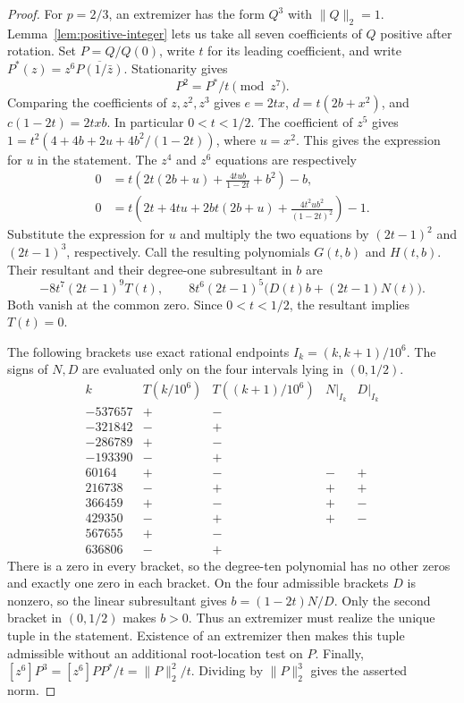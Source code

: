 \documentclass[11pt]{article}
\begin{document}
\begin{proof}
For \(p=2/3\), an extremizer has the form \(Q^3\) with
\(\|Q\|_2=1\). Lemma~\ref{lem:positive-integer} lets us
take all seven coefficients of \(Q\) positive after rotation.
Set \(P=Q/Q(0)\), write \(t\) for its leading coefficient, and
write \(P^*(z)=z^6\overline{P(1/\bar z)}\).
Stationarity gives
\[
 P^2=P^*/t\pmod{z^7}.
\]
Comparing the coefficients of \(z,z^2,z^3\) gives
\(e=2tx\), \(d=t(2b+x^2)\), and \(c(1-2t)=2txb\).
In particular \(0<t<1/2\). The coefficient of \(z^5\)
gives \(1=t^2(4+4b+2u+4b^2/(1-2t))\), where \(u=x^2\).
This gives the expression for \(u\) in the statement.
The \(z^4\) and \(z^6\) equations are respectively
\[
 \begin{split}
 0 &=t\left(2t(2b+u)+\frac{4tub}{1-2t}+b^2\right)-b,\\
 0 &=t\left(2t+4tu+2bt(2b+u)+\frac{4t^2ub^2}{(1-2t)^2}\right)-1.
 \end{split}
\]
Substitute the expression for \(u\) and multiply the two
equations by \((2t-1)^2\) and \((2t-1)^3\), respectively. Call the
resulting polynomials \(G(t,b)\) and \(H(t,b)\).
Their resultant and their degree-one subresultant in \(b\) are
\[
 -8t^7(2t-1)^9 T(t),\qquad
 8t^6(2t-1)^5\bigl(D(t)b+(2t-1)N(t)\bigr).
\]
Both vanish at the common zero. Since \(0<t<1/2\), the
resultant implies \(T(t)=0\).

The following brackets use exact rational endpoints
\(I_k=(k,k+1)/10^6\). The signs of \(N,D\) are evaluated only on
the four intervals lying in \((0,1/2)\).
\[
\begin{array}{r|cc|cc}
 k & T(k/10^6)&T((k+1)/10^6)&N|_{I_k}&D|_{I_k}\\ \hline
 -537657 &+&-& &\\
 -321842 &-&+& &\\
 -286789 &+&-& &\\
 -193390 &-&+& &\\
   60164 &+&-&-&+\\
  216738 &-&+&+&+\\
  366459 &+&-&+&-\\
  429350 &-&+&+&-\\
  567655 &+&-& &\\
  636806 &-&+& &
\end{array}
\]
There is a zero in every bracket, so the degree-ten polynomial
has no other zeros and exactly one zero in each bracket.
On the four admissible brackets \(D\) is nonzero, so the linear
subresultant gives \(b=(1-2t)N/D\). Only the second bracket in
\((0,1/2)\) makes \(b>0\). Thus an extremizer must realize the
unique tuple in the statement. Existence of an extremizer then
makes this tuple admissible without an additional root-location
test on \(P\). Finally,
\([z^6]P^3=[z^6]PP^*/t=\|P\|_2^2/t\).
Dividing by \(\|P\|_2^3\) gives the asserted norm.
\end{proof}
\end{document}
